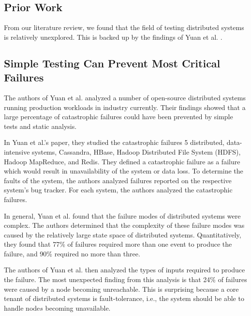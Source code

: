 \begin{multicols}{2}
\setlength{\columnsep}{1cm}

\begin{abstract}
\end{abstract}


\section{Prior Work}

From our literature review, we found that the field of testing distributed systems is relatively unexplored.
This is backed up by the findings of Yuan et al. \cite{simpletesting}.

\subsection{Simple Testing Can Prevent Most Critical Failures}

The authors of Yuan et al. analyzed a number of open-source distributed systems running production workloads in industry currently.
Their findings showed that a large percentage of catastrophic failures could have been prevented by simple tests and static analysis.

In Yuan et al.'s paper, they studied the catastrophic failures 5 distributed, data-intensive systems, Cassandra, HBase, Hadoop Distributed File System (HDFS), Hadoop MapReduce, and Redis.
They defined a catastrophic failure as a failure which would result in unavailability of the system or data loss.
To determine the faults of the system, the authors analyzed failures reported on the respective system's bug tracker.
For each system, the authors analyzed the catastrophic failures.

In general, Yuan et al. found that the failure modes of distributed systems were complex.
The authors determined that the complexity of these failure modes was caused by the relatively large state space of distributed systems.
Quantitatively, they found that 77\% of failures required more than one event to produce the failure, and 90\% required no more than three.

The authors of Yuan et al. then analyzed the types of inputs required to produce the failure.
The most unexpected finding from this analysis is that 24\% of failures were caused by a node becoming unreachable.
This is surprising because a core tenant of distributed systems is fault-tolerance, i.e., the system should be able to handle node\(s\) becoming unavailable.


\end{multicols}
